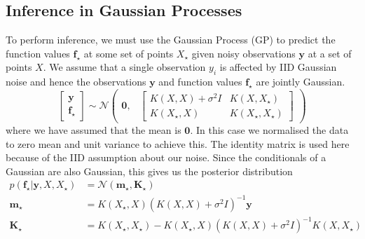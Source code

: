 \documentclass[10pt]{article}
\begin{document}
\subsection*{Inference in Gaussian Processes}
To perform inference, we must use the Gaussian Process (GP) to predict the function values $\mathbf{f}_{\star}$ at some set of points
$X_{\star}$ given noisy observations $\mathbf{y}$ at a set of points $X$. We assume that a single observation $y_i$ is affected by
IID Gaussian noise and hence the observations $\mathbf{y}$ and function values $\mathbf{f}_{\star}$ are jointly Gaussian.
\[
    \begin{bmatrix}
        \mathbf{y} \\
        \mathbf{f}_{\star}
    \end{bmatrix} \sim
    \mathcal{N}\begin{pmatrix}
        \mathbf{0}, & 
        \begin{bmatrix}
            K(X, X) + \sigma^2 I & K(X, X_{\star}) \\
            K(X_{\star}, X) & K(X_{\star}, X_{\star}) 
        \end{bmatrix}
    \end{pmatrix}
\]
where we have assumed that the mean is $\mathbf{0}$. In this case we normalised the data to zero mean and unit variance to achieve this.
The identity matrix is used here because of the IID assumption about our noise.
Since the conditionals of a Gaussian are also Gaussian, this gives us the posterior distribution
\begin{align*}
p(\mathbf{f}_{\star} \left| \mathbf{y}, X, X_{\star}\right.) &= \mathcal{N}(\mathbf{m}_{\star}, \mathbf{K}_{\star}) \\
\mathbf{m}_{\star} &= K(X_{\star}, X) (K(X, X) + \sigma^2 I)^{-1} \mathbf{y} \\
\mathbf{K}_{\star} &= K(X_{\star}, X_{\star}) - K(X_{\star}, X) (K(X, X) + \sigma^2 I)^{-1} K(X, X_{\star})
\end{align*}
\end{document}
